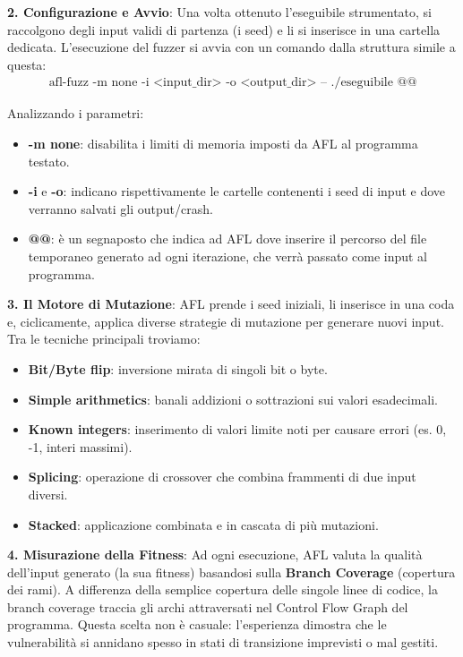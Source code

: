 \textbf{2. Configurazione e Avvio}: Una volta ottenuto l'eseguibile strumentato, si 
raccolgono degli input validi di partenza (i seed) e li si inserisce in una cartella 
dedicata. L'esecuzione del fuzzer si avvia con un comando dalla struttura simile a 
questa:
\begin{gather*}
    \text{afl-fuzz -m none -i <input\_dir> -o <output\_dir> -- ./eseguibile @@}
\end{gather*}

Analizzando i parametri:

\begin{itemize}
    \item \textbf{-m none}: disabilita i limiti di memoria imposti da AFL al programma testato.
    \item \textbf{-i} e \textbf{-o}: indicano rispettivamente le cartelle contenenti i seed di input e dove verranno salvati gli output/crash.
    \item \textbf{@@}: è un segnaposto che indica ad AFL dove inserire il percorso del file temporaneo generato ad ogni iterazione, che verrà passato come input al programma.
\end{itemize}

\textbf{3. Il Motore di Mutazione}: AFL prende i seed iniziali, li inserisce in una 
coda e, ciclicamente, applica diverse strategie di mutazione per generare nuovi input. 
Tra le tecniche principali troviamo:

\begin{itemize}
    \item \textbf{Bit/Byte flip}: inversione mirata di singoli bit o byte.
    \item \textbf{Simple arithmetics}: banali addizioni o sottrazioni sui valori esadecimali.
    \item \textbf{Known integers}: inserimento di valori limite noti per causare errori (es. 0, -1, interi massimi).
    \item \textbf{Splicing}: operazione di crossover che combina frammenti di due input diversi.
    \item \textbf{Stacked}: applicazione combinata e in cascata di più mutazioni.
\end{itemize}

\textbf{4. Misurazione della Fitness}: Ad ogni esecuzione, AFL valuta la qualità 
dell'input generato (la sua fitness) basandosi sulla \textbf{Branch Coverage} 
(copertura dei rami). A differenza della semplice copertura delle singole linee di 
codice, la branch coverage traccia gli archi attraversati nel Control Flow Graph del 
programma. Questa scelta non è casuale: l'esperienza dimostra che le vulnerabilità 
si annidano spesso in stati di transizione imprevisti o mal gestiti.

